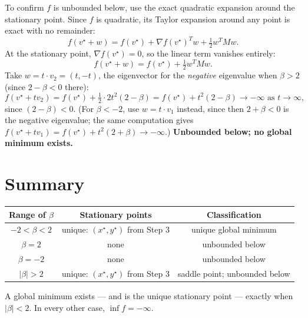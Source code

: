 \documentclass[11pt]{article}
\begin{document}
To confirm $f$ is unbounded below, use the exact quadratic expansion around the stationary point. Since $f$ is quadratic, its Taylor expansion around any point is exact with no remainder:
\[
f(v^\star+w) = f(v^\star) + \nabla f(v^\star)^Tw + \tfrac12 w^TMw.
\]
At the stationary point, $\nabla f(v^\star)=0$, so the linear term vanishes entirely:
\[
f(v^\star+w) = f(v^\star) + \tfrac12w^TMw.
\]
Take $w = t\cdot v_2 = (t,-t)$, the eigenvector for the \emph{negative} eigenvalue when $\beta>2$ (since $2-\beta<0$ there):
\[
f(v^\star+tv_2) = f(v^\star) + \tfrac12\cdot 2t^2(2-\beta) = f(v^\star) + t^2(2-\beta) \to -\infty \text{ as } t\to\infty,
\]
since $(2-\beta)<0$. (For $\beta<-2$, use $w=t\cdot v_1$ instead, since then $2+\beta<0$ is the negative eigenvalue; the same computation gives $f(v^\star+tv_1) = f(v^\star)+t^2(2+\beta)\to-\infty$.) \textbf{Unbounded below; no global minimum exists.}

\section*{Summary}

\begin{center}
\begin{tabular}{|c|c|c|}
\hline
\textbf{Range of $\beta$} & \textbf{Stationary points} & \textbf{Classification} \\
\hline
$-2<\beta<2$ & unique: $(x^\star,y^\star)$ from Step 3 & unique global minimum \\
$\beta=2$ & none & unbounded below \\
$\beta=-2$ & none & unbounded below \\
$|\beta|>2$ & unique: $(x^\star,y^\star)$ from Step 3 & saddle point; unbounded below \\
\hline
\end{tabular}
\end{center}

A global minimum exists --- and is the unique stationary point --- exactly when $|\beta|<2$. In every other case, $\inf f = -\infty$.
\end{document}
